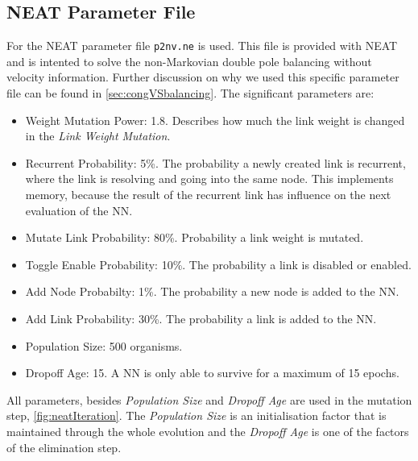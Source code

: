 \subsection{NEAT Parameter File}\label{subsec:neatparameter}
For the NEAT parameter file \texttt{p2nv.ne} is used. This file is provided with NEAT and is intented to solve the non-Markovian double pole balancing without velocity information. Further discussion on why we used this specific parameter file can be found in \autoref{sec:congVSbalancing}. The significant parameters are:
\begin{itemize}
	\item{Weight Mutation Power: 1.8. Describes how much the link weight is changed in the \textit{Link Weight Mutation}.}
	\item{Recurrent Probability: 5\%. The probability a newly created link is recurrent, where the link is resolving and going into the same node. This implements memory, because the result of the recurrent link has influence on the next evaluation of the NN. }
	\item{Mutate Link Probability: 80\%. Probability a link weight is mutated.}
	\item{Toggle Enable Probability: 10\%. The probability a link is disabled or enabled.}
	\item{Add Node Probabilty: 1\%. The probability a new node is added to the NN.}
	\item{Add Link Probability: 30\%. The probability a link is added to the NN.}
	\item{Population Size: 500 organisms.}
	\item{Dropoff Age: 15. A NN is only able to survive for a maximum of 15 epochs.}
	
\end{itemize}
All parameters, besides \textit{Population Size} and \textit{Dropoff Age} are used in the mutation step, \autoref{fig:neatIteration}. The \textit{Population Size} is an initialisation factor that is maintained through the whole evolution and the \textit{Dropoff Age} is one of the factors of the elimination step.


